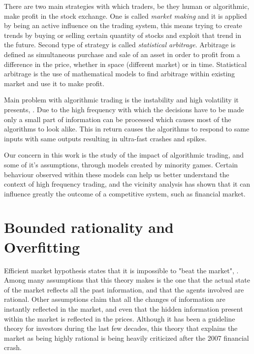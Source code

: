 There are two main strategies with which traders, be they human or algorithmic, make profit in the stock exchange. 
One is called \textit{market making} and it is applied by being an active influence on the trading system, this means trying to create trends by buying or selling certain quantity of stocks and exploit that trend in the future.
Second type of strategy is called \textit{statistical arbitrage}.
Arbitrage is defined as simultaneous purchase and sale of an asset in order to profit from a difference in the price, whether in space (different market) or in time.
Statistical arbitrage is the use of mathematical models to find arbitrage within existing market and use it to make profit.

Main problem with algorithmic trading is the instability and high volatility it presents, \cite{johnson2012financial}.
Due to the high frequency with which the decisions have to be made only a small part of information can be processed which causes most of the algorithms to look alike.
This in return causes the algorithms to respond to same inputs with same outputs resulting in ultra-fast crashes and spikes.

Our concern in this work is the study of the impact of algorithmic trading, and some of it's assumptions, through models created by minority games. 
Certain behaviour observed within these models can help us better understand the context of high frequency trading, and the vicinity analysis has shown that it can influence greatly the outcome of a competitive system, such as financial market.

\section{Bounded rationality and Overfitting}
\label{1:overfitting}

Efficient market hypothesis states that it is impossible to "beat the market", \cite{efficientmarket}. Among many assumptions that this theory makes is the one that the actual state of the market reflects all the past information, and that the agents involved are rational.
Other assumptions claim that all the changes of information are instantly reflected in the market, and even that the hidden information present within the market is reflected in the prices. 
Although it has been a guideline theory for investors during the last few decades, this theory that explains the market as being highly rational is being heavily criticized after the 2007 financial crash.

